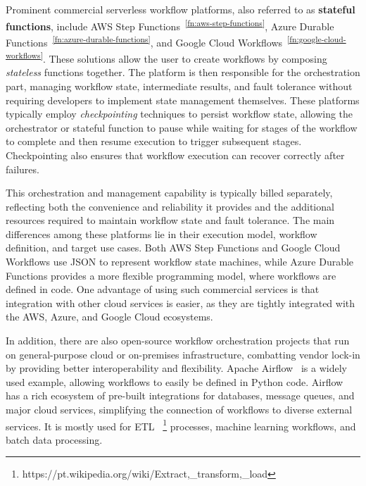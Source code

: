 \documentclass[conference]{IEEEtran}
\begin{document}
Prominent commercial serverless workflow platforms, also referred to as \textbf{stateful functions}, include AWS Step Functions~\textsuperscript{\ref{fn:aws-step-functions}}, Azure Durable Functions~\textsuperscript{\ref{fn:azure-durable-functions}}, and Google Cloud Workflows~\textsuperscript{\ref{fn:google-cloud-workflows}}. These solutions allow the user to create workflows by composing \textit{stateless} functions together. The platform is then responsible for the orchestration part, managing workflow state, intermediate results, and fault tolerance without requiring developers to implement state management themselves. These platforms typically employ \textit{checkpointing} techniques to persist workflow state, allowing the orchestrator or stateful function to pause while waiting for stages of the workflow to complete and then resume execution to trigger subsequent stages. Checkpointing also ensures that workflow execution can recover correctly after failures.

This orchestration and management capability is typically billed separately, reflecting both the convenience and reliability it provides and the additional resources required to maintain workflow state and fault tolerance. The main differences among these platforms lie in their execution model, workflow definition, and target use cases. Both AWS Step Functions and Google Cloud Workflows use JSON to represent workflow state machines, while Azure Durable Functions provides a more flexible programming model, where workflows are defined in code. One advantage of using such commercial services is that integration with other cloud services is easier, as they are tightly integrated with the AWS, Azure, and Google Cloud ecosystems.

In addition, there are also open-source workflow orchestration projects that run on general-purpose cloud or on-premises infrastructure, combatting vendor lock-in by providing better interoperability and flexibility. Apache Airflow~\cite{apache_airflow} is a widely used example, allowing workflows to easily be defined in Python code. Airflow has a rich ecosystem of pre-built integrations for databases, message queues, and major cloud services, simplifying the connection of workflows to diverse external services. It is mostly used for ETL ~\footnote{\label{fn:etl}https://pt.wikipedia.org/wiki/Extract,\_transform,\_load} processes, machine learning workflows, and batch data processing.
\end{document}

